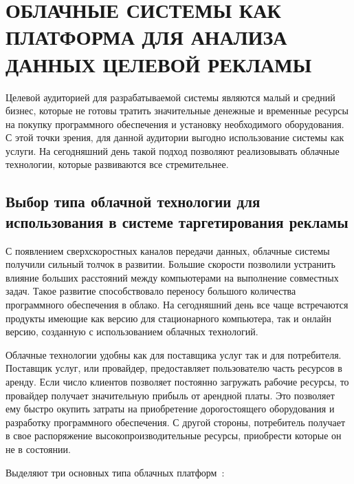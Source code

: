 \chapter{ОБЛАЧНЫЕ СИСТЕМЫ КАК ПЛАТФОРМА ДЛЯ АНАЛИЗА ДАННЫХ ЦЕЛЕВОЙ РЕКЛАМЫ}

Целевой аудиторией для разрабатываемой системы являются малый и средний бизнес, которые не готовы тратить значительные денежные и временные ресурсы на покупку программного обеспечения и установку необходимого оборудования. С этой точки зрения, для данной аудитории выгодно использование системы как услуги. На сегодняшний день такой подход позволяют реализовывать облачные технологии, которые развиваются все стремительнее.

\section{Выбор типа облачной технологии для использования в системе таргетирования рекламы}

С появлением сверхскоростных каналов передачи данных, облачные системы получили сильный толчок в развитии. Большие скорости позволили устранить влияние больших расстояний между компьютерами на выполнение совместных задач. Такое развитие способствовало переносу большого количества программного обеспечения в облако. На сегодняшний день все чаще встречаются продукты имеющие как версию для стационарного компьютера, так и онлайн версию, созданную с использованием облачных технологий.

Облачные технологии удобны как для поставщика услуг так и для потребителя. Поставщик услуг, или провайдер, предоставляет пользователю часть ресурсов в аренду. Если число клиентов позволяет постоянно загружать рабочие ресурсы, то провайдер получает значительную прибыль от арендной платы. Это позволяет ему быстро окупить затраты на приобретение дорогостоящего оборудования и разработку программного обеспечения.
С другой стороны, потребитель получает в свое распоряжение высокопроизводительные ресурсы, приобрести которые он не в состоянии. 

Выделяют три основных типа облачных платформ~\cite{sareen2013cloud}:

